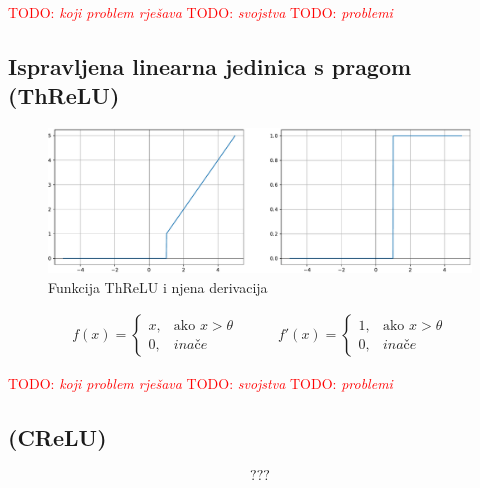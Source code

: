 \documentclass[times, utf8, numeric, diplomski]{fer}
\def\otherwise{\textit{inače}}
\def\TODO#1{\noindent\textcolor{red}{TODO: \textit{#1}}\newline}
\def\todo#1{\TODO{#1}}
\def\todoimg#1{\begin{center} \textcolor{red}{\big[ IMAGE: \textit{#1} \big]} \end{center}}
\begin{document}
\todo{koji problem rješava}
\todo{svojstva}
\todo{problemi}
\fi %

\subsection{Ispravljena linearna jedinica s pragom (ThReLU)}

\begin{figure}[H]
\includegraphics[width=\textwidth]{ThReLU.pdf}
\centering
\caption{Funkcija ThReLU i njena derivacija}
\label{fig:threlu}
\end{figure}

\begin{equation}
\label{eq:threlu}
\begin{split}
f(x) = 
\begin{cases}
x,		& \text{ako } x > \theta \\
0,		& \otherwise
\end{cases}
\end{split}
\qquad
\begin{split}
f'(x) = 
\begin{cases}
1,		& \text{ako } x > \theta \\
0,		& \otherwise
\end{cases}
\end{split}
\end{equation}

\todo{koji problem rješava}
\todo{svojstva}
\todo{problemi}

\iffalse %
\subsection{(CReLU)}

\todoimg{}

\begin{equation}
???
\end{equation}
\end{document}
